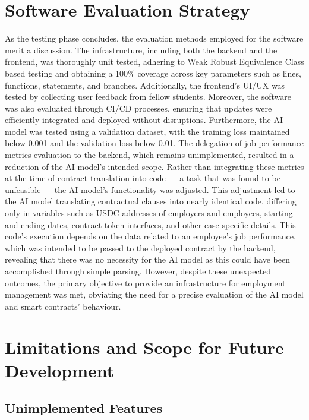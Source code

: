 \section{Software Evaluation Strategy}

As the testing phase concludes, the evaluation methods employed for the software merit a discussion. The infrastructure, including both the backend and the frontend, was thoroughly unit tested, adhering to Weak Robust Equivalence Class based testing and obtaining a 100\% coverage across key parameters such as lines, functions, statements, and branches. Additionally, the frontend's UI/UX was tested by collecting user feedback from fellow students. Moreover, the software was also evaluated through CI/CD processes, ensuring that updates were efficiently integrated and deployed without disruptions. Furthermore, the AI model was tested using a validation dataset, with the training loss maintained below 0.001 and the validation loss below 0.01. The delegation of job performance metrics evaluation to the backend, which remains unimplemented, resulted in a reduction of the AI model's intended scope. Rather than integrating these metrics at the time of contract translation into code — a task that was found to be unfeasible — the AI model's functionality was adjusted. This adjustment led to the AI model translating contractual clauses into nearly identical code, differing only in variables such as USDC addresses of employers and employees, starting and ending dates, contract token interfaces, and other case-specific details. This code's execution depends on the data related to an employee's job performance, which was intended to be passed to the deployed contract by the backend, revealing that there was no necessity for the AI model as this could have been accomplished through simple parsing. However, despite these unexpected outcomes, the primary objective to provide an infrastructure for employment management was met, obviating the need for a precise evaluation of the AI model and smart contracts' behaviour.

\section{Limitations and Scope for Future Development}

\subsection{Unimplemented Features}

